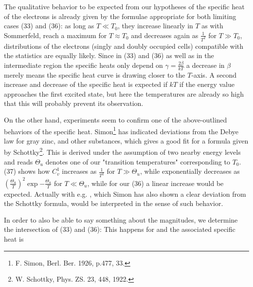 \begin{paper}{1}
The qualitative behavior to be expected from our hypotheses of the specific heat of the electrons is already given by the formulae appropriate for both limiting cases (33) and (36): as long as $T\ll T_0$, they increase linearly in $T$ as with Sommerfeld, reach a maximum for $T\approx T_0$ and decreases again as $\frac{1}{T^2}$ for $T\gg T_0$,  distributions of the electrons (singly and doubly occupied cells) compatible with the statistics are equally likely. Since in (33) and (36) as well as in the intermediate region the specific heats only depend on $\gamma = \frac{2\beta}{kT}$ a decrease in $\beta$ merely means the specific heat curve is drawing closer to the $T$-axis. A second increase and decrease of the specific heat is expected if $kT$ if the energy value approaches the first excited state, but here the temperatures are already so high that this will probably prevent its observation.

On the other hand, experiments seem to confirm one of the above-outlined behaviors of the specific heat. Simon\footnote{F. Simon, Berl. Ber. 1926, p.477, 33.} has indicated deviations from the Debye law for gray zinc,  and other substances, which gives a good fit for a formula given by Schottky\footnote{W. Schottky, Phys. ZS. 23, 448, 1922.}. This is derived under the assumption of two nearby energy levels and reads
$\Theta_u$ denotes one of our "transition temperatures" corresponding to $T_0$. (37) shows how $C_v^1$ increases as $\frac{1}{T^2}$ for $T\gg\Theta_u$, while exponentially decreases as $\left(\frac{\Theta_u}{T}\right)^2\exp{-\frac{\Theta_u}{T}}$ for $T\ll\Theta_u$, while for our (36) a linear increase would be expected. Actually with e.g. , which Simon has also shown a clear deviation from the Schottky formula, would be interpreted in the sense of such behavior.

In order to also be able to say something about the magnitudes, we determine the intersection of (33) and (36):
This happens for
and the associated specific heat is


\end{paper}
